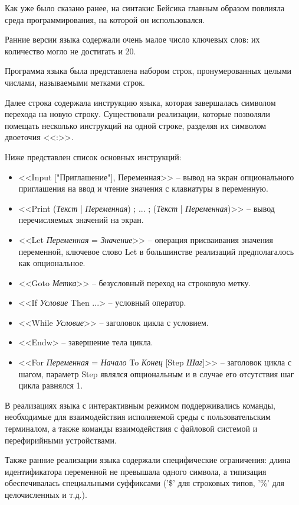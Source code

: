 Как уже было сказано ранее, на синтакис Бейсика главным образом 
повлияла среда программирования, на которой он использовался.

Ранние версии языка содержали очень малое число ключевых слов:
их количество могло не достигать и 20.

Программа языка была представлена набором строк,
пронумерованных целыми числами, называемыми метками строк.

Далее строка содержала инструкцию языка, которая завершалась 
символом перехода на новую строку. Существовали реализации,
которые позволяли помещать несколько инструкций на одной строке,
разделяя их символом двоеточия <<:>>.

Ниже представлен список основных инструкций:

\begin{itemize}
    \item <<Input ["Приглашение"], Переменная>> -- вывод на экран
          опционального приглашения на ввод и чтение
          значения с клавиатуры в переменную.
          
    \item <<Print 
          (\emph{Текст} | \emph{Переменная}) 
          ; ... ; 
          (\emph{Текст} | \emph{Переменная})>> --
          вывод перечисляемых значений на экран.

    \item <<Let \emph{Переменная} = \emph{Значение}>> -- операция 
          присваивания значения переменной, 
          ключевое слово Let в большинстве реализаций
          предполагалось как опциональное.

    \item <<Goto \emph{Метка}>> -- безусловный переход на строковую метку.
    
    \item <<If \emph{Условие} Then ...> -- условный оператор.
    
    \item <<While \emph{Условие}>> -- заголовок цикла с условием.
    
    \item <<Endw> -- завершение тела цикла.
    
    \item <<For \emph{Переменная} = \emph{Начало} 
          To \emph{Конец} [Step \emph{Шаг}]>> -- заголовок
          цикла с шагом, параметр Step являлся опциональным и 
          в случае его отсутствия шаг цикла равнялся 1.
\end{itemize}

В реализациях языка с интерактивным режимом поддерживались
команды, необходимые для взаимодействия исполняемой
среды с пользовательским терминалом, а также команды взаимодействия
с файловой системой и перефирийными устройствами.

Также ранние реализации языка содержали специфические ограничения:
длина идентификатора переменной не превышала одного символа,
а типизация обеспечивалась специальными суффиксами
('\$' для строковых типов, '\%' для целочисленных и т.д.).